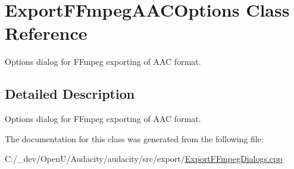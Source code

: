 \hypertarget{class_export_f_fmpeg_a_a_c_options}{}\section{Export\+F\+Fmpeg\+A\+A\+C\+Options Class Reference}
\label{class_export_f_fmpeg_a_a_c_options}


Options dialog for F\+Fmpeg exporting of A\+AC format.  




\subsection{Detailed Description}
Options dialog for F\+Fmpeg exporting of A\+AC format. 

The documentation for this class was generated from the following file\+:\begin{DoxyCompactItemize}
\item 
C\+:/\+\_\+dev/\+Open\+U/\+Audacity/audacity/src/export/\hyperlink{_export_f_fmpeg_dialogs_8cpp}{Export\+F\+Fmpeg\+Dialogs.\+cpp}\end{DoxyCompactItemize}
